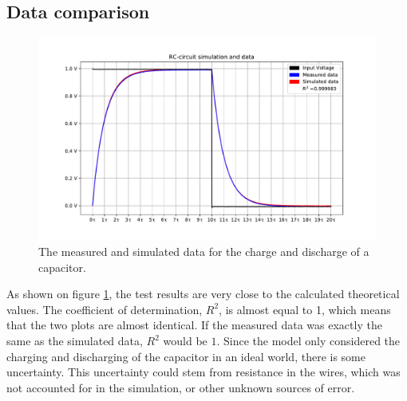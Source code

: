 \subsection{Data comparison}
\begin{figure}[H]
\center
\includegraphics[scale=0.6]{fig/img/eks_1}
\caption{The measured and simulated data for the charge and discharge of a capacitor.}
\label{fig:Cap}
\end{figure}
\noindent
As shown on figure \ref{fig:Cap}, the test results are very close to the calculated theoretical values. The coefficient of determination, $R^2$, is almost equal to 1, which means that the two plots are almost identical. If the measured data was exactly the same as the simulated data, $R^2$ would be $1$. Since the model only considered the charging and discharging of the capacitor in an ideal world, there is some uncertainty. This uncertainty could stem from resistance in the wires, which was not accounted for in the simulation, or other unknown sources of error.